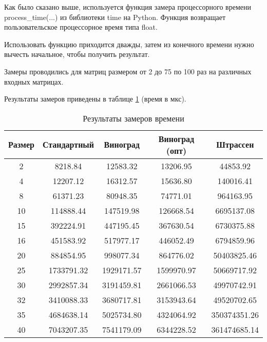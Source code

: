 Как было сказано выше, используется функция замера процессорного времени process\_time(...) из библиотеки time на Python. Функция возвращает пользовательское процессорное время типа float.

Использовать функцию приходится дважды, затем из конечного времени нужно вычесть начальное, чтобы получить результат.

Замеры проводились для матриц размером от 2 до 75 по 100 раз на различных входных матрицах.

Результаты замеров приведены в таблице \ref{tbl:time_mes} (время в мкс).

\begin{table}[h]
    \begin{center}
        \begin{threeparttable}
        \captionsetup{justification=raggedright,singlelinecheck=off}
        \caption{Результаты замеров времени}
        \label{tbl:time_mes}
        \begin{tabular}{|c|c|c|c|c|}
            \hline
            Размер & Стандартный & Виноград & Виноград (опт) & Штрассен \\ 
            \hline
            2 & 8218.84 & 12583.32 & 13206.95 & 44853.92 \\ 
            \hline
            4 & 12207.12 & 16312.57 & 15636.80 & 140016.41 \\ 
            \hline
            8 & 61371.23 & 80948.35 & 74771.01 & 964163.95 \\ 
            \hline
            10 & 114888.44 & 147519.98 & 126668.54 & 6695137.08 \\ 
            \hline
            15 & 392224.91 & 447195.45 & 367630.54 & 6730375.88 \\ 
            \hline
            16 & 451583.92 & 517977.17 & 446052.49 & 6794859.96 \\ 
            \hline
            20 & 884854.95 & 998077.34 & 864776.02 & 50403825.46 \\ 
            \hline
            25 & 1733791.32 & 1929171.57 & 1599970.97 & 50669717.92 \\ 
            \hline
            30 & 2992857.34 & 3191459.81 & 2661066.53 & 49970742.91 \\ 
            \hline
            32 & 3410088.33 & 3680717.81 & 3153943.64 & 49520702.65 \\ 
            \hline
            35 & 4684638.14 & 5025734.80 & 4324064.92 & 350374351.26 \\ 
            \hline
            40 & 7043207.35 & 7541179.09 & 6344228.52 & 361474685.14 \\ 

\end{tabular}
\end{threeparttable}
\end{center}
\end{table}
